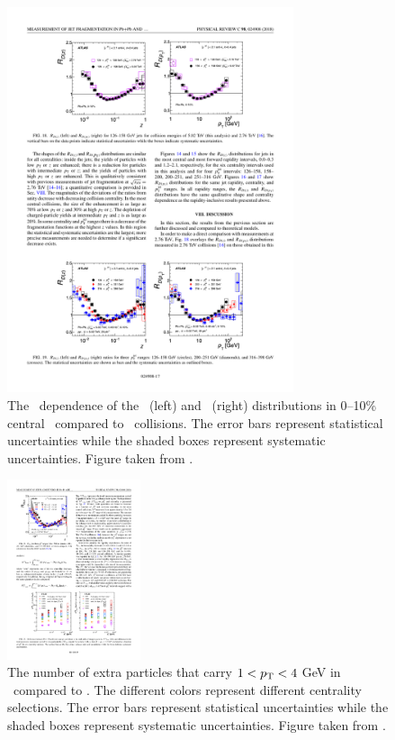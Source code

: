 \begin{figure}[htbp]
\begin{center}
\includegraphics[width=0.75\textwidth]{figures/jetMeasurements/jetff_jetpt_dep}
\caption{The \ptjet\ dependence of the \Rdz\ (left) and \Rdpt\ (right) distributions in 0--10\% central \pbpb\ compared to \pp\ collisions. The error bars represent statistical uncertainties while the shaded boxes represent systematic uncertainties. Figure taken from \cite{PhysRevC.98.024908}.}
\label{fig:jetff_jetpt_dep}
\end{center}
\end{figure}


\begin{figure}[htbp]
\begin{center}
\includegraphics[width=0.35\textwidth]{figures/jetMeasurements/jetff_nch}
\caption{The number of extra particles that carry $1<\mbox{$p_{\mathrm{T}}$}<4$ GeV  in \pbpb\ compared to \pp. The different colors represent different centrality selections. The error bars represent statistical uncertainties while the shaded boxes represent systematic uncertainties. Figure taken from \cite{PhysRevC.98.024908}.}
\label{fig:jetff_nch}
\end{center}
\end{figure}

